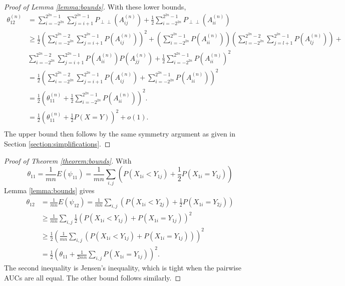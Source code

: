 \documentclass[12pt]{article}
\DeclareMathOperator{\AUC}{AUC}
\newcommand{\E}{E}
\renewcommand{\P}{P}
\newcommand{\cind}{\perp \!\!\! \perp}
\newcommand{\aucindiv}{\theta_{11}}%
\newcommand{\aucpop}{\theta_{12}}%
\newcommand{\Kernel}{\psi}
\newcommand{\Pind}{P_{\cind}}
\newcommand{\A}[1]{P(A^{(n)}_{#1})}
\begin{document}
\begin{proof}[Proof of Lemma \ref{lemma:bounds}]


    With these lower bounds,
    \begin{align}
    \aucpop^{(n)} &= \sum_{i=-2^{2n}}^{2^{2n}-1}\sum_{j=i+1}^{2^{2n}-1} \Pind(A_{ij}^{(n)})
                    + \frac{1}{2}\sum_{i=-2^{2n}}^{2^{2n}-1} \Pind(A_{ii}^{(n)})\\
                  &\ge \frac{1}{2}\left(\sum_{i=-2^{2n}}^{2^{2n}-2}\sum_{j=i+1}^{2^{2n}-1}\A{ij}\right)^2 +
                    \left(\sum_{i=-2^{2n}}^{2^{2n}-1}\A{ii}\right)
                    \left(\sum_{l=-2^{2n}}^{2^{2n}-2}\sum_{j=l+1}^{2^{2n}-1}\A{lj}\right) +\\
                  &\sum_{i=-2^{2n}}^{2^{2n}-2}\sum_{j=i+1}^{2^{2n}-1} \A{ii}\A{jj}
                    + \frac{1}{2}\sum_{i=-2^{2n}}^{2^{2n}-1} \P(A_{ii}^{(n)})^2\\
                  &= \frac{1}{2}\left(\sum_{i=-2^{2n}}^{2^{2n}-2}\sum_{j=i+1}^{2^{2n}-1}\A{ij} +
                    \sum_{i=-2^{2n}}^{2^{2n}-1} \P(A_{ii}^{(n)})\right)^2\\
      &= \frac{1}{2}\left(\aucindiv^{(n)} +\frac{1}{2}\sum_{i=-2^{2n}}^{2^{2n}-1} \P(A_{ii}^{(n)})\right)^2.\\
      &= \frac{1}{2}\left(\aucindiv^{(n)} +\frac{1}{2}\P(X=Y)\right)^2+o(1).\\
    \end{align}
     The upper bound then follows by the same symmetry argument as given in Section \ref{section:simplifications}.

  \end{proof}

\begin{proof}[Proof of Theorem \ref{theorem:bounds}]

  With
  $$
  \aucindiv = \frac{1}{mn}\E(\Kernel_{11}) = \frac{1}{mn}\sum_{i,j}(\P(X_{1i}<Y_{1j})+\frac{1}{2}\P(X_{1i}=Y_{1j}))
  $$
  Lemma \ref{lemma:bounds} gives
  \begin{align}
    \aucpop &= \frac{1}{mn}\E(\Kernel_{12}) = \frac{1}{mn}\sum_{i,j}(P(X_{1i}<Y_{2j})+\frac{1}{2}\P(X_{1i}=Y_{2j}))\\
    &\ge \frac{1}{mn}\sum_{i,j}\frac{1}{2}(\P(X_{1i}<Y_{1j})+\P(X_{1i}=Y_{1j}))^2\\
    &\ge \frac{1}{2}\left(\frac{1}{mn}\sum_{i,j}(\P(X_{1i}<Y_{1j})+\P(X_{1i}=Y_{1j}))\right)^2\\
    &= \frac{1}{2}\left(\aucindiv + \frac{1}{2mn}\sum_{i,j}\P(X_{1i}=Y_{1j})\right)^2.
  \end{align}
  The second inequality is Jensen's inequality, which is tight when
  the pairwise AUCs are all equal.  The other bound follows similarly.
\end{proof}
\end{document}
